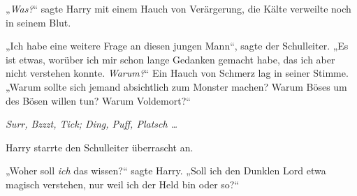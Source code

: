 „\emph{Was?}“ sagte Harry mit einem Hauch von Verärgerung, die Kälte verweilte noch in seinem Blut.

„Ich habe eine weitere Frage an diesen jungen Mann“, sagte der Schulleiter.
„Es ist etwas, worüber ich mir schon lange Gedanken gemacht habe, das ich aber nicht verstehen konnte. \emph{Warum?}“ Ein Hauch von Schmerz lag in seiner Stimme.
„Warum sollte sich jemand absichtlich zum Monster machen? Warum Böses um des Bösen willen tun? Warum Voldemort?“

\later

\emph{Surr, Bzzzt, Tick; Ding, Puff, Platsch …}

Harry starrte den Schulleiter überrascht an.

„Woher soll \emph{ich} das wissen?“ sagte Harry.
„Soll ich den Dunklen Lord etwa magisch verstehen, nur weil ich der Held bin oder so?“

